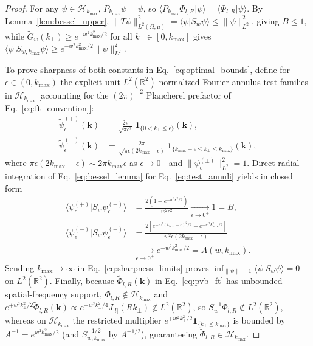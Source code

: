 \documentclass[aps,pra,reprint,amsmath,amssymb,floatfix,longbibliography]{revtex4-2}
\providecommand{\braket}[2]{\langle#1\vert#2\rangle}
\providecommand{\abs}[1]{\lvert#1\rvert}
\providecommand{\norm}[1]{\lVert#1\rVert}
\begin{document}
\begin{proof}
For any $\psi \in \mathcal{H}_{k_{\max}}$, $P_{k_{\max}}\psi = \psi$, so $\braket{P_{k_{\max}}\Phi_{l,R}}{\psi} = \braket{\Phi_{l,R}}{\psi}$. By Lemma~\ref{lem:bessel_upper}, $\norm{T\psi}_{L^2(\Omega,\mu)}^2 = \braket{\psi}{S_w\psi} \le \norm{\psi}_{L^2}^2$, giving $B \le 1$, while $\widetilde{G}_w(k_\perp) \ge e^{-w^2 k_{\max}^2/2}$ for all $k_\perp \in [0, k_{\max}]$ gives $\braket{\psi}{S_{w,k_{\max}}\psi} \ge e^{-w^2 k_{\max}^2/2}\norm{\psi}_{L^2}^2$.

To prove sharpness of both constants in Eq.~\eqref{eq:optimal_bounds}, define for $\epsilon \in (0, k_{\max})$ the explicit unit-$L^2(\mathbb{R}^2)$-normalized Fourier-annulus test families in $\mathcal{H}_{k_{\max}}$ [accounting for the $(2\pi)^{-2}$ Plancherel prefactor of Eq.~\eqref{eq:ft_convention}]:
\begin{align}
\widetilde{\psi}_\epsilon^{(+)}(\mathbf{k}) &= \frac{2\pi}{\sqrt{\pi\epsilon^2}}\,\mathbf{1}_{\{0 < k_\perp \le \epsilon\}}(\mathbf{k}), \nonumber \\
\widetilde{\psi}_\epsilon^{(-)}(\mathbf{k}) &= \frac{2\pi}{\sqrt{\pi\epsilon(2k_{\max}-\epsilon)}}\,\mathbf{1}_{\{k_{\max}-\epsilon \le k_\perp \le k_{\max}\}}(\mathbf{k}),
\label{eq:test_annuli}
\end{align}
where $\pi\epsilon(2k_{\max}-\epsilon) \sim 2\pi k_{\max}\epsilon$ as $\epsilon \to 0^+$ and $\norm{\psi_\epsilon^{(\pm)}}_{L^2}^2 = 1$. Direct radial integration of Eq.~\eqref{eq:bessel_lemma} for Eq.~\eqref{eq:test_annuli} yields in closed form
\begin{align}
\braket{\psi_\epsilon^{(+)}}{S_w\psi_\epsilon^{(+)}} &= \frac{2\left(1 - e^{-w^2\epsilon^2/2}\right)}{w^2\epsilon^2} \xrightarrow[\epsilon \to 0^+]{} 1 = B, \nonumber \\
\braket{\psi_\epsilon^{(-)}}{S_w\psi_\epsilon^{(-)}} &= \frac{2\left[e^{-w^2(k_{\max}-\epsilon)^2/2} - e^{-w^2 k_{\max}^2/2}\right]}{w^2\epsilon(2k_{\max}-\epsilon)} \nonumber \\
&\xrightarrow[\epsilon \to 0^+]{} e^{-w^2 k_{\max}^2/2} = A(w, k_{\max}).
\label{eq:sharpness_limits}
\end{align}
Sending $k_{\max} \to \infty$ in Eq.~\eqref{eq:sharpness_limits} proves $\inf_{\norm{\psi}=1}\braket{\psi}{S_w\psi} = 0$ on $L^2(\mathbb{R}^2)$. Finally, because $\widetilde{\Phi}_{l,R}(\mathbf{k})$ in Eq.~\eqref{eq:pvb_ft} has unbounded spatial-frequency support, $\Phi_{l,R} \notin \mathcal{H}_{k_{\max}}$ and $e^{+w^2 k_\perp^2/2}\widetilde{\Phi}_{l,R}(\mathbf{k}) \propto e^{+w^2 k_\perp^2/4} J_{\abs{l}}(Rk_\perp) \notin L^2(\mathbb{R}^2)$, so $S_w^{-1}\Phi_{l,R} \notin L^2(\mathbb{R}^2)$, whereas on $\mathcal{H}_{k_{\max}}$ the restricted multiplier $e^{+w^2 k_\perp^2/2}\mathbf{1}_{\{k_\perp \le k_{\max}\}}$ is bounded by $A^{-1} = e^{w^2 k_{\max}^2/2}$ (and $S_{w,k_{\max}}^{-1/2}$ by $A^{-1/2}$), guaranteeing $\widetilde{\Phi}_{l,R} \in \mathcal{H}_{k_{\max}}$.
\end{proof}
\end{document}
